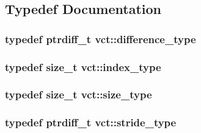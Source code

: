 \subsection{Typedef Documentation}
\hypertarget{namespacevct_a1c68f426f63d011adc3563911c76550c}{
\subsubsection[{difference\-\_\-type}]{\setlength{\rightskip}{0pt plus 5cm}typedef ptrdiff\-\_\-t {\bf vct\-::difference\-\_\-type}}}\label{namespacevct_a1c68f426f63d011adc3563911c76550c}
\hypertarget{namespacevct_a50405d87494dce1f22ee3930ca285ee9}{
\subsubsection[{index\-\_\-type}]{\setlength{\rightskip}{0pt plus 5cm}typedef size\-\_\-t {\bf vct\-::index\-\_\-type}}}\label{namespacevct_a50405d87494dce1f22ee3930ca285ee9}
\hypertarget{namespacevct_a3e2935e13aac4500965e00d30565775b}{
\subsubsection[{size\-\_\-type}]{\setlength{\rightskip}{0pt plus 5cm}typedef size\-\_\-t {\bf vct\-::size\-\_\-type}}}\label{namespacevct_a3e2935e13aac4500965e00d30565775b}
\hypertarget{namespacevct_ababd20afe3b060aa77ea229b0226c154}{
\subsubsection[{stride\-\_\-type}]{\setlength{\rightskip}{0pt plus 5cm}typedef ptrdiff\-\_\-t {\bf vct\-::stride\-\_\-type}}}\label{namespacevct_ababd20afe3b060aa77ea229b0226c154}
